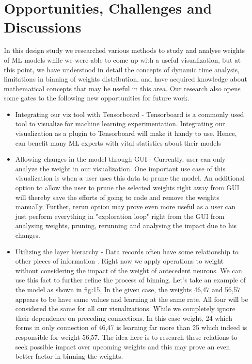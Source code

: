 \documentclass[journal]{vgtc}                %
\begin{document}
\section{Opportunities, Challenges and Discussions}

In this design study we researched various methods to study and analyse weights of ML models while we were able to come up with a useful visualization, but at this point, we have understood in detail the concepts of dynamic time analysis, limitations in binning of weights distribution, and have acquired knowledge about mathematical concepts that may be useful in this area. Our research also opens some gates to the following new opportunities for future work.
\begin{itemize}
\item Integrating our viz tool with Tensorboard - Tensorboard is a commonly used tool to visualize for machine learning experimentation. Integrating our visualization as a plugin to Tensorboard will make it handy to use. Hence, can benefit many ML experts with vital statistics about their models
\item Allowing changes in the model through GUI - Currently, user can only analyze the weight in our visualization. One important use case of this visualization is when a user uses this data to prune the model. An additional option to allow the user to prune the selected weights right away from GUI will thereby save the efforts of going to code and remove the weights manually. Further, rerun option may prove even more useful as a user can just perform everything in "exploration loop" \cite{knowGenMode} right from the GUI from analysing weights, pruning, rerunning and analysing the impact due to his changes.
\item Utilizing the layer hierarchy  - Data records often have some relationship to other pieces
of information \cite{keim2002information}. Right now we apply operations to weight without considering the impact of the weight of antecedent neurons. We can use this fact to further refine the process of binning. 
Let's take an example of the model as shown in fig:15, In the given case, the weights 46,47 and 56,57 appears to be have same values and learning at the same rate. All four will be considered the same for all our visualizations. While we completely ignore their dependence on preceding connections. In this case weight, 24 which forms in only connection of 46,47 is learning far more than 25 which indeed is responsible for weight 56,57. The idea here is to research these relations to seek possible impact over upcoming weights and this may prove an even better factor in binning the weights.


\end{itemize}
\end{document}

